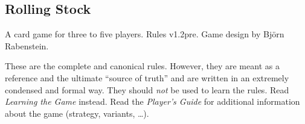 \documentclass[11pt,a4paper]{article}
\begin{document}
\begin{center}
\section*{Rolling Stock}

A card game for three to five players. Rules v1.2pre. Game design by
Björn Rabenstein.
\end{center}

These are the complete and canonical rules. However, they are meant as
a reference and the ultimate ``source of truth'' and are written in an
extremely condensed and formal way. They should \emph{not} be used to
learn the rules. Read \emph{Learning the Game} instead.  Read the
\emph{Player's Guide} for additional information about the game
(strategy, variants, \dots).
\end{document}

